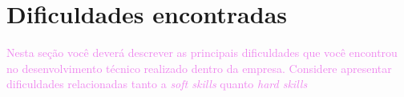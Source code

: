 \section{Dificuldades encontradas}
\label{sec:dificuldades}

\textcolor{violet}{Nesta seção você deverá descrever as principais dificuldades que você encontrou no desenvolvimento técnico realizado dentro da empresa. Considere apresentar dificuldades relacionadas tanto a \textit{soft skills} quanto \textit{hard skills}}
